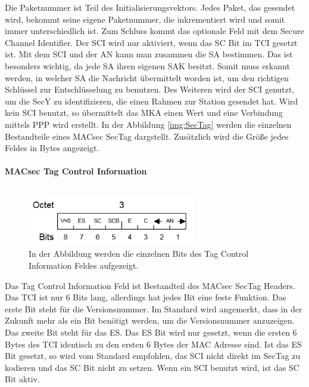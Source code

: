 Die Paketnummer ist Teil des Initialisierungsvektors. Jedes Paket, das gesendet wird, bekommt seine eigene Paketnummer, die inkrementiert wird und somit immer unterschiedlich ist. %
Zum Schluss kommt das optionale Feld mit dem Secure Channel Identifier. Der \gls{SCI} wird nur aktiviert, wenn das \gls{SC} Bit im \gls{TCI} gesetzt ist. Mit dem \gls{SCI} und der \gls{AN} kann man zusammen die \gls{SA} bestimmen. Das ist besonders wichtig, da jede \gls{SA} ihren eigenen \gls{SAK} besitzt. Somit muss erkannt werden, in welcher \gls{SA} die Nachricht übermittelt worden ist, um den richtigen Schlüssel zur Entschlüsselung zu benutzen. Des Weiteren wird der \gls{SCI} genutzt, um die \gls{SecY} zu identifizieren, die einen Rahmen zur Station gesendet hat. Wird kein SCI benutzt, so übermittelt das \gls{MKA} einen Wert und eine Verbindung mittels \gls{PPP} wird erstellt. In der Abbildung \ref{img:SecTag} werden die einzelnen Bestandteile eines MACsec SecTag dargstellt. Zusätzlich wird die Größe jedes Feldes in Bytes angezeigt.\\
\\
\textbf{MACsec Tag Control Information}\\
\\
\begin{figure}
	
	\centering \includegraphics[width=0.65\textwidth]{images/TAG_Feld.PNG}
	\caption[Tag Control Information Feld]{In der Abbildung werden die einzelnen Bits des Tag Control Information Feldes aufgezeigt.}
	\label{img:TAG_Feld}
\end{figure}Das Tag Control Information Feld ist Bestandteil des \gls{MACsec} SecTag Headers. Das \gls{TCI} ist nur 6 Bits lang, allerdings hat jedes Bit eine feste Funktion.
Das erste Bit steht für die Versionsnummer. Im Standard wird angemerkt, dass in der Zukunft mehr als ein Bit benötigt werden, um die Versionsnummer anzuzeigen.
Das zweite Bit steht für das \gls{ES}. Das ES Bit wird nur gesetzt, wenn die ersten 6 Bytes des \gls{TCI} identisch zu den ersten 6 Bytes der MAC Adresse sind. Ist das ES Bit gesetzt, so wird vom Standard \cite{1678345} empfohlen, das SCI nicht direkt im SecTag zu kodieren und das SC Bit nicht zu setzen.
Wenn ein SCI benutzt wird, ist das SC Bit aktiv.
